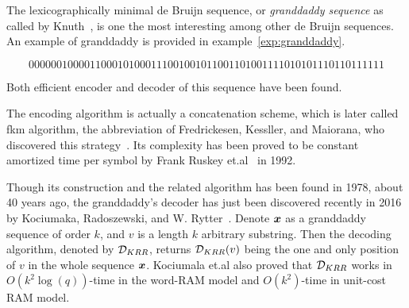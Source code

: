The lexicographically minimal de Bruijn sequence, or \textit{granddaddy sequence} as called by Knuth~\cite{knuth2013art}, is one the most interesting among other de Bruijn sequences. An example of granddaddy is provided in example~\ref{exp:granddaddy}.
\begin{example}\label{exp:granddaddy}
    \[0000001000011000101000111001001011001101001111010101110110111111\]    
\end{example}
Both efficient encoder and decoder of this sequence have been found.

The encoding algorithm is actually a concatenation scheme, which is later called \gls{fkm} algorithm, the abbreviation of Fredrickesen, Kessller, and Maiorana, who discovered this strategy~\cite{fredricksen1978necklaces,fredricksen1986algorithm}. Its complexity has been proved to be constant amortized time per symbol by Frank Ruskey et.al~\cite{ruskey1992generating} in 1992.

Though its construction and the related algorithm has been found in 1978, about 40 years ago, the granddaddy's decoder has just been discovered recently in 2016 by Kociumaka, Radoszewski, and W. Rytter~\cite{kociumaka2016efficient}. Denote ${\boldsymbol x}$ as a granddaddy sequence of order $k$, and $v$ is a length $k$ arbitrary substring. Then the decoding algorithm, denoted by ${\cal D}_{KRR}$, returns ${\cal D}_{KRR}(v)$ being the one and only position of $v$ in the whole sequence ${\boldsymbol x}$. Kociumala et.al also proved that ${\cal D}_{KRR}$ works in $O(k^2\log(q))$-time in the word-RAM model and $O(k^{2})$-time in unit-cost RAM model.